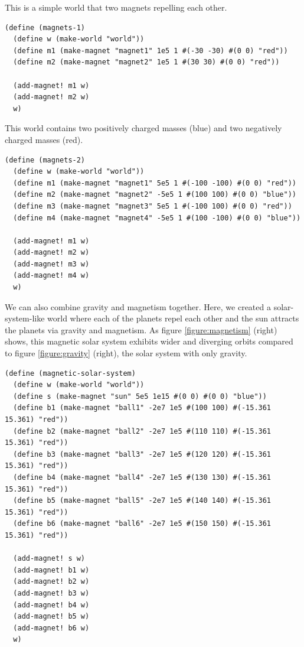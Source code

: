 \documentclass{article}
\begin{document}
This is a simple world that two magnets repelling each other.
{\small\begin{verbatim}
(define (magnets-1)
  (define w (make-world "world"))
  (define m1 (make-magnet "magnet1" 1e5 1 #(-30 -30) #(0 0) "red"))
  (define m2 (make-magnet "magnet2" 1e5 1 #(30 30) #(0 0) "red"))

  (add-magnet! m1 w)
  (add-magnet! m2 w)
  w)
\end{verbatim}}

This world contains two positively charged masses (blue) and two negatively charged masses (red).
{\small\begin{verbatim}
(define (magnets-2)
  (define w (make-world "world"))
  (define m1 (make-magnet "magnet1" 5e5 1 #(-100 -100) #(0 0) "red"))
  (define m2 (make-magnet "magnet2" -5e5 1 #(100 100) #(0 0) "blue"))
  (define m3 (make-magnet "magnet3" 5e5 1 #(-100 100) #(0 0) "red"))
  (define m4 (make-magnet "magnet4" -5e5 1 #(100 -100) #(0 0) "blue"))

  (add-magnet! m1 w)
  (add-magnet! m2 w)
  (add-magnet! m3 w)
  (add-magnet! m4 w)
  w)
\end{verbatim}}

We can also combine gravity and magnetism together. Here, we created a solar-system-like world where each of the planets repel each other and the sun attracts the planets via gravity and magnetism. As figure \ref{figure:magnetism} (right) shows, this magnetic solar system exhibits wider and diverging orbits compared to figure \ref{figure:gravity} (right), the solar system with only gravity. 
{\small\begin{verbatim}
(define (magnetic-solar-system)
  (define w (make-world "world"))
  (define s (make-magnet "sun" 5e5 1e15 #(0 0) #(0 0) "blue"))
  (define b1 (make-magnet "ball1" -2e7 1e5 #(100 100) #(-15.361 15.361) "red"))
  (define b2 (make-magnet "ball2" -2e7 1e5 #(110 110) #(-15.361 15.361) "red"))
  (define b3 (make-magnet "ball3" -2e7 1e5 #(120 120) #(-15.361 15.361) "red"))
  (define b4 (make-magnet "ball4" -2e7 1e5 #(130 130) #(-15.361 15.361) "red"))
  (define b5 (make-magnet "ball5" -2e7 1e5 #(140 140) #(-15.361 15.361) "red"))
  (define b6 (make-magnet "ball6" -2e7 1e5 #(150 150) #(-15.361 15.361) "red"))

  (add-magnet! s w)
  (add-magnet! b1 w)
  (add-magnet! b2 w)
  (add-magnet! b3 w)
  (add-magnet! b4 w)
  (add-magnet! b5 w)
  (add-magnet! b6 w)
  w)
\end{verbatim}}
\end{document}
